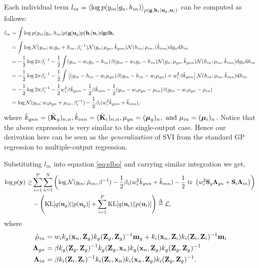 \documentclass{article} %
\begin{document}
\noindent Each individual term $l_{in} = \left\langle \log p(y_{in} | g_n, h_{in}) \right\rangle_{p(\mathbf{g},\mathbf{h}_i | \mathbf{u}_g, \mathbf{u}_i)}$ can be computed as follows:
\begin{align}
\nonumber
l_{in} &= \int \log p(y_{in} | g_n, h_{in}) p(\mathbf{g} | \mathbf{u}_g) p(\mathbf{h}_i | \mathbf{u}_i) \mathrm{d} \mathbf{g} \mathrm{d} \mathbf{h}_i \\
\nonumber
&= \int \log \mathcal{N}(y_{in} ; w_i g_n + h_{in}, \beta_i^{-1}) 
\mathcal{N}(g_n ; \mu_{gn}, \tilde{k}_{gnn})
\mathcal{N}(h_{in} ; \mu_{in}, (\tilde{k}_{inn}) \mathrm{d} g_n \mathrm{d} h_{in} \\
\nonumber
&= -\frac{1}{2} \log 2 \pi \beta_i^{-1} - \frac{1}{2} \int (y_{in} - w_i g_n - h_{in}) \beta (y_{in} - w_i g_n - h_{in})
\mathcal{N}(g_n ; \mu_{gn}, \tilde{k}_{gnn})
\mathcal{N}(h_{in} ; \mu_{in}, \tilde{k}_{inn}) \mathrm{d} g_n \mathrm{d} h_{in} \\
\nonumber
&= -\frac{1}{2} \log 2 \pi \beta_i^{-1} - \frac{1}{2} \int \left[(y_{in} - h_{in} - w_i \mu_{gn}) \beta (y_{in} - h_{in} - w_i \mu_{gn}) + w_i^2 \beta \tilde{k}_{gnn} \right] 
\mathcal{N}(h_{in} ; \mu_{in}, \tilde{k}_{inn}) \mathrm{d} h_{in} \\
\nonumber
&= -\frac{1}{2} \log 2 \pi \beta_i^{-1} - \frac{1}{2} w_i^2 \beta \tilde{k}_{gnn}
- \frac{1}{2} \beta \tilde{k}_{inn} - \frac{1}{2} (y_{in} - w_i \mu_{gn} - \mu_{in}) \beta (y_{in} - w_i \mu_{gn} - \mu_{in}) \\
&= \log \mathcal{N}(y_{in}; w_i \mu_{gn} + \mu_{in}, \beta_i^{-1})  - \frac{1}{2} \beta_i (w_i^2 \tilde{k}_{gnn} + \tilde{k}_{inn}),
\end{align}
where $\tilde{k}_{gnn} = (\tilde{\mathbf{K}}_g)_{n,n}, \tilde{k}_{inn} = (\tilde{\mathbf{K}}_i)_{n,n}, \mu_{gn} = (\boldsymbol{\mu}_g)_n, \text{ and } \mu_{in} = (\boldsymbol{\mu}_i)_n$.
Notice that the above expression is very similar to the single-output case.
Hence our derivation here can be seen as the \textit{generalization} of SVI from the standard GP regression to multiple-output regression.

\noindent Substituting $l_{in}$ into equation \ref{eq:elbo} and carrying similar integration we get,
\begin{align}
\nonumber
\log p(\mathbf{y})
\ge& \sum_{i=1}^P \sum_{n=1}^N
 \left( \log \mathcal{N}(y_{in}; \tilde{\mu}_{in}, \beta^{-1})
         - \frac{1}{2} \beta_i (w_i^2 \tilde{k}_{gnn} + \tilde{k}_{inn})
         - \frac{1}{2} \mbox{ \rm tr } \left( w_i^2 \mathbf{S}_g \mathbf{\Lambda}_{gn} + \mathbf{S}_i \mathbf{\Lambda}_{in} \right)
\right) \\
&- \left( \text{KL}[q(\mathbf{u}_g) || p(\mathbf{u}_g)] + \sum_{i=1}^P \text{KL}[q(\mathbf{u}_i) || p(\mathbf{u}_i)] \right) \overset{\Delta}{=} \mathcal{L},
\end{align}
where 
\begin{align}
\tilde{\mu}_{in}
&= w_i k_g(\mathbf{x}_n, \mathbf{Z}_g)k_g(\mathbf{Z}_g,\mathbf{Z}_g)^{-1}\mathbf{m}_g + k_i(\mathbf{x}_n, \mathbf{Z}_i)k_i(\mathbf{Z}_i,\mathbf{Z}_i)^{-1}\mathbf{m}_i \\
\mathbf{\Lambda}_{gn}
&= \beta k_g(\mathbf{Z}_g,\mathbf{Z}_g)^{-1} k_g(\mathbf{Z}_g, \mathbf{x}_n) k_g(\mathbf{x}_n, \mathbf{Z}_g) k_g(\mathbf{Z}_g,\mathbf{Z}_g)^{-1} \\
\mathbf{\Lambda}_{in}
&= \beta k_i(\mathbf{Z}_i,\mathbf{Z}_i)^{-1} k_i(\mathbf{Z}_i, \mathbf{x}_n) k_i(\mathbf{x}_n, \mathbf{Z}_g) k_i(\mathbf{Z}_g,\mathbf{Z}_g)^{-1}.
\end{align}
\end{document}
